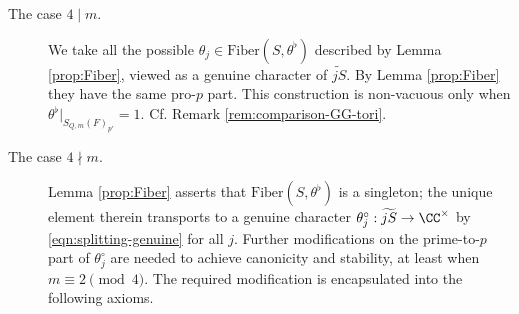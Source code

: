 \documentclass[a4paper,10pt]{article}
\begin{document}
\begin{description}
	\item[The case $4 \mid m$.] We take all the possible $\theta_j \in \text{Fiber}(S, \theta^\flat)$ described by Lemma \ref{prop:Fiber}, viewed as a genuine character of $\widetilde{jS}$. By Lemma \ref{prop:Fiber} they have the same pro-$p$ part. This construction is non-vacuous only when $\theta^\flat|_{S_{Q,m}(F)_{p'}} = 1$. Cf. Remark \ref{rem:comparison-GG-tori}.
	\item[The case $4 \nmid m$.] Lemma \ref{prop:Fiber} asserts that $\text{Fiber}(S, \theta^\flat)$ is a singleton; the unique element therein transports to a genuine character $\theta^\circ_j: \widetilde{jS} \to \CC^\times$ by \eqref{eqn:splitting-genuine} for all $j$. Further modifications on the prime-to-$p$ part of $\theta^\circ_j$ are needed to achieve canonicity and stability, at least when $m \equiv 2 \pmod 4$. The required modification is encapsulated into the following axioms.
\end{description}
\end{document}
